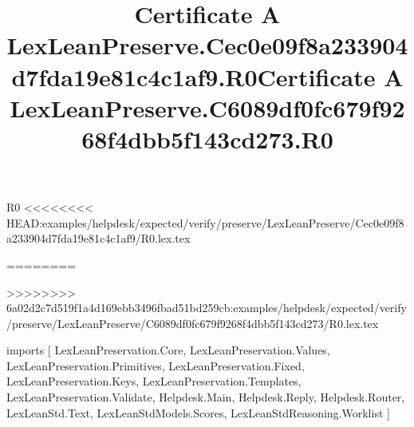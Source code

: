 \begin{lexlean}{R0}
<<<<<<<< HEAD:examples/helpdesk/expected/verify/preserve/LexLeanPreserve/Cec0e09f8a233904d7fda19e81c4c1af9/R0.lex.tex
\title{Certificate A LexLeanPreserve.Cec0e09f8a233904d7fda19e81c4c1af9.R0}
========
\title{Certificate A LexLeanPreserve.C6089df0fc679f9268f4dbb5f143cd273.R0}
>>>>>>>> 6a02d2c7d519f1a4d169ebb3496fbad51bd259cb:examples/helpdesk/expected/verify/preserve/LexLeanPreserve/C6089df0fc679f9268f4dbb5f143cd273/R0.lex.tex
\begin{coremodule}
imports [
  LexLeanPreservation.Core,
  LexLeanPreservation.Values,
  LexLeanPreservation.Primitives,
  LexLeanPreservation.Fixed,
  LexLeanPreservation.Keys,
  LexLeanPreservation.Templates,
  LexLeanPreservation.Validate,
  Helpdesk.Main,
  Helpdesk.Reply,
  Helpdesk.Router,
  LexLeanStd.Text,
  LexLeanStdModels.Scores,
  LexLeanStdReasoning.Worklist
]


\end{coremodule}
\end{lexlean}
